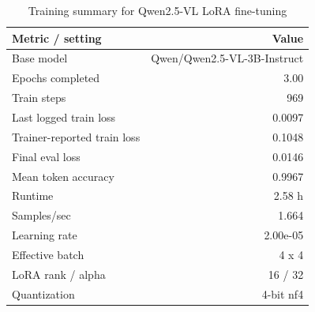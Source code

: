 \documentclass{article}
\begin{document}
\begin{table}[htbp]
  \centering
  \caption{Training summary for Qwen2.5-VL LoRA fine-tuning}
  \label{tab:training_summary}
  \begin{tabular}{lr}
    \toprule
    \textbf{Metric / setting} & \textbf{Value} \\
    \midrule
    Base model & Qwen/Qwen2.5-VL-3B-Instruct \\
    Epochs completed & 3.00 \\
    Train steps & 969 \\
    Last logged train loss & 0.0097 \\
    Trainer-reported train loss & 0.1048 \\
    Final eval loss & 0.0146 \\
    Mean token accuracy & 0.9967 \\
    Runtime & 2.58 h \\
    Samples/sec & 1.664 \\
    Learning rate & 2.00e-05 \\
    Effective batch & 4 x 4 \\
    LoRA rank / alpha & 16 / 32 \\
    Quantization & 4-bit nf4 \\
    \bottomrule
  \end{tabular}
\end{table}
\end{document}
